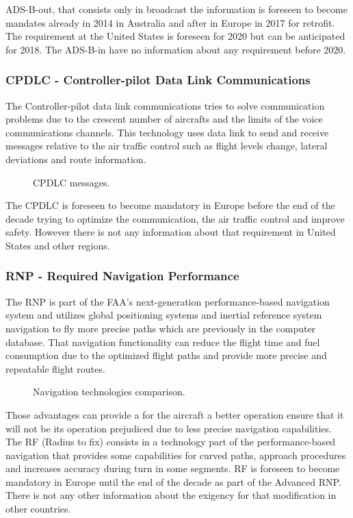 ADS-B-out, that consists only in broadcast the information is foreseen to become mandates already in 2014 in Australia and after in Europe in 2017 for retrofit. The requirement at the United States is foreseen for 2020 but can be anticipated for 2018. The ADS-B-in have no information about any requirement before 2020.

\subsubsection{CPDLC - Controller-pilot Data Link Communications}
The Controller-pilot data link communications tries to solve communication problems due to the crescent number of aircrafts and the limits of the voice communications channels. This technology uses data link to send and receive messages relative to the air traffic control such as flight levels change, lateral deviations and route information.
\begin{figure}[H] %
\caption{CPDLC messages.}
\label{fig:CPDLCmessages}
\end{figure}
The CPDLC is foreseen to become mandatory in Europe before the end of the decade  trying to optimize the communication, the air traffic control and improve safety. However there is not any information about that requirement in United States and other regions.


\subsubsection{RNP - Required Navigation Performance}
The RNP is part of the FAA's next-generation performance-based navigation system and utilizes global positioning systems and inertial reference system navigation to fly more precise paths which are previously in the computer database. That navigation functionality can reduce the flight time and fuel consumption due to the optimized flight paths and provide more precise and repeatable flight routes.

\begin{figure}[H] %
\caption{Navigation technologies comparison.}
\label{fig:NavigationTechnologiesComparison}
\end{figure}

Those advantages can provide a for the aircraft a better operation ensure that it will not be its operation prejudiced due to less precise navigation capabilities.
\\The RF (Radius to fix) consists in a technology part of the performance-based navigation that provides some capabilities for curved paths, approach procedures and increases accuracy during turn in some segments. RF is foreseen to become mandatory in Europe until the end of the decade as part of the Advanced RNP. There is not any other information about the exigency for that modification in other countries.


